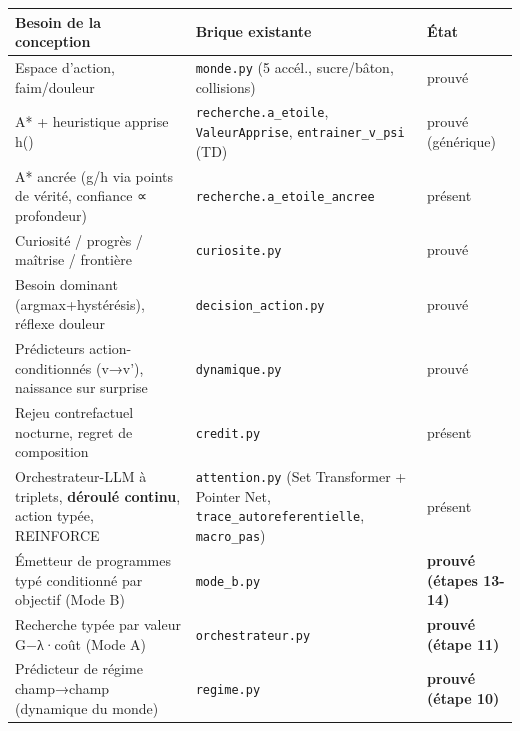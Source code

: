 \documentclass[
  french,
  11pt,
]{article}
\newcounter{none} %
\begin{document}
{\def\LTcaptype{none} %
\begin{longtable}[]{@{}
  >{\raggedright\arraybackslash}p{}
  >{\raggedright\arraybackslash}p{}
  >{\raggedright\arraybackslash}p{}@{}}
\toprule\noalign{}
\begin{minipage}[b]{\linewidth}\raggedright
Besoin de la conception
\end{minipage} & \begin{minipage}[b]{\linewidth}\raggedright
Brique existante
\end{minipage} & \begin{minipage}[b]{\linewidth}\raggedright
État
\end{minipage} \\
\midrule\noalign{}
\endhead
\bottomrule\noalign{}
\endlastfoot
Espace d'action, faim/douleur & \texttt{monde.py} (5 accél.,
sucre/bâton, collisions) & prouvé \\
A* + heuristique apprise h() & \texttt{recherche.a\_etoile},
\texttt{ValeurApprise}, \texttt{entrainer\_v\_psi} (TD) & prouvé
(générique) \\
A* ancrée (g/h via points de vérité, confiance ∝ profondeur) &
\texttt{recherche.a\_etoile\_ancree} & présent \\
Curiosité / progrès / maîtrise / frontière & \texttt{curiosite.py} &
prouvé \\
Besoin dominant (argmax+hystérésis), réflexe douleur &
\texttt{decision\_action.py} & prouvé \\
Prédicteurs action-conditionnés (v→v'), naissance sur surprise &
\texttt{dynamique.py} & prouvé \\
Rejeu contrefactuel nocturne, regret de composition & \texttt{credit.py}
& présent \\
Orchestrateur-LLM à triplets, \textbf{déroulé continu}, action typée,
REINFORCE & \texttt{attention.py} (Set Transformer + Pointer Net,
\texttt{trace\_autoreferentielle}, \texttt{macro\_pas}) & présent \\
Émetteur de programmes typé conditionné par objectif (Mode B) &
\texttt{mode\_b.py} & \textbf{prouvé (étapes 13-14)} \\
Recherche typée par valeur G−λ·coût (Mode A) & \texttt{orchestrateur.py}
& \textbf{prouvé (étape 11)} \\
Prédicteur de régime champ→champ (dynamique du monde) &
\texttt{regime.py} & \textbf{prouvé (étape 10)} \\
\end{longtable}
}
\end{document}
